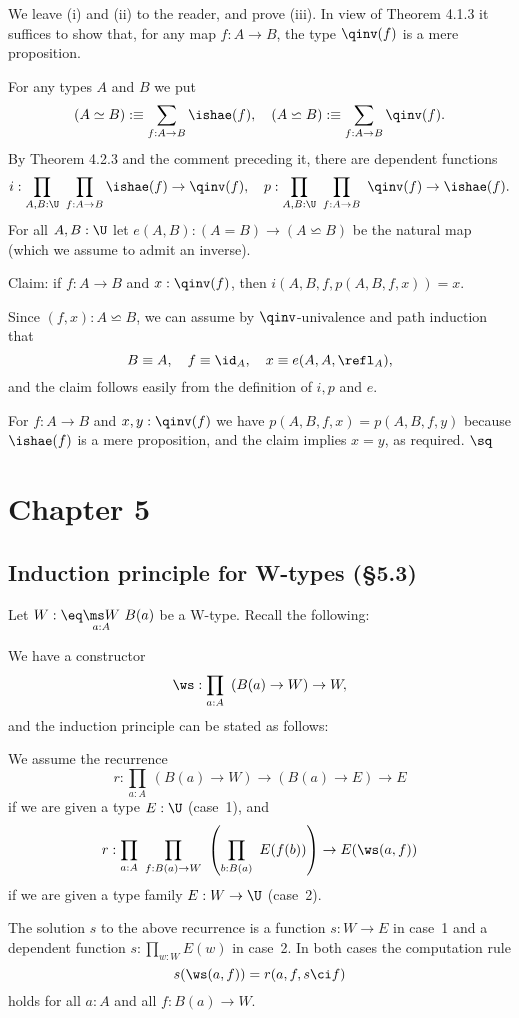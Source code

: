 \documentclass[12pt]{article}
\begin{document}
We leave (i) and (ii) to the reader, and prove (iii). In view of Theorem 4.1.3 it suffices to show that, for any map $f:A\to B$, the type $\qinv(f)$ is a mere proposition. 

For any types $A$ and $B$ we put 
$$
(A\simeq B):\equiv\sum_{f:A\to B}\ishae(f),\quad(A\backsimeq B):\equiv\sum_{f:A\to B}\qinv(f).
$$ 
By Theorem 4.2.3 and the comment preceding it, there are dependent functions 
$$
i:\prod_{A,B:\U}\ \prod_{f:A\to B}\ishae(f)\to\qinv(f),\quad p:\prod_{A,B:\U}\ \prod_{f:A\to B}\ \qinv(f)\to\ishae(f).
$$ 
For all $A,B:\U$ let $e(A,B):(A=B)\to(A\backsimeq B)$ be the natural map (which we assume to admit an inverse).

Claim: if $f:A\to B$ and $x:\qinv(f)$, then $i(A,B,f,p(A,B,f,x))=x$.
 
Since $(f,x):A\backsimeq B$, we can assume by $\qinv$-univalence and path induction that 
$$
B\equiv A,\quad f\equiv\id_A,\quad x\equiv e(A,A,\refl_A),
$$ 
and the claim follows easily from the definition of $i,p$ and $e$.

For $f:A\to B$ and $x,y:\qinv(f)$ we have $p(A,B,f,x)=p(A,B,f,y)$ because $\ishae(f)$ is a mere proposition, and the claim implies $x=y$, as required. $\sq$


\section{Chapter 5}

\subsection{Induction principle for W-types (\S5.3)}%

Let $W:\eq\underset{a:A}{\ms W}\ B(a)$ be a W-type. Recall the following: 

We have a constructor 
$$
\ws:\prod_{a:A}\ \left(B(a)\to W\right)\to W, 
$$ 
and the induction principle can be stated as follows:

We assume the recurrence 
$$
r:\prod_{a:A}\ (B(a)\to W)\to(B(a)\to E)\to E
$$ 
if we are given a type $E:\U$ (case~1), and 
$$
r:\prod_{a:A}\ \prod_{f:B(a)\to W}\ \left(\prod_{b:B(a)}\ E(f(b))\right)\to E(\ws(a,f))
$$ 
if we are given a type family $E:W\to\U$ (case~2). 

The solution $s$ to the above recurrence is a function $s:W\to E$ in case~1 and a dependent function $s:\prod_{w:W}E(w)$ in case~2. In both cases the computation rule 
$$
s(\ws(a,f))=r(a,f,s\ci f)
$$ 
holds for all $a:A$ and all $f:B(a)\to W$.
\end{document}
